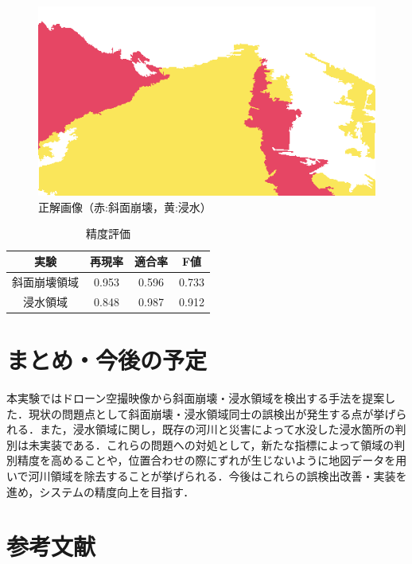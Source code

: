 \documentclass[a4paper, twocolumn, xelatex, 8pt, ja=standard, Ligatures=TeX]{bxjsarticle}
\begin{document}
	\begin{figure}[t]
		\begin{minipage}{0.48\hsize}
			\centering
			\includegraphics[width=\linewidth]{img/answer.png}
			\caption{正解画像（赤:斜面崩壊，黄:浸水）}
			\label{img08}
		\end{minipage}
	\end{figure}

	\begin{table}[t]
		\centering
		\caption{精度評価}
		\label{tab04}
		\begin{tabular}{c c c c}
			\hline
				実験 & 再現率 & 適合率 & F値 \\ \hline
				斜面崩壊領域 & 0.953 & 0.596 & 0.733 \\
				浸水領域 & 0.848 & 0.987 & 0.912 \\ \hline
		\end{tabular}
	\end{table}

\section{まとめ・今後の予定}
	本実験ではドローン空撮映像から斜面崩壊・浸水領域を検出する手法を提案した．現状の問題点として斜面崩壊・浸水領域同士の誤検出が発生する点が挙げられる．また，浸水領域に関し，既存の河川と災害によって水没した浸水箇所の判別は未実装である．これらの問題への対処として，新たな指標によって領域の判別精度を高めることや，位置合わせの際にずれが生じないように地図データを用いで河川領域を除去することが挙げられる．今後はこれらの誤検出改善・実装を進め，システムの精度向上を目指す．

\section{参考文献}		

\end{document}
